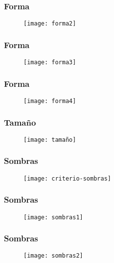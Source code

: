 \documentclass[14pt]{beamer}
\begin{document}
 \begin{frame}
\frametitle{Forma}
 \begin{figure}
    \centering
    \texttt{[image: forma2]}
  \end{figure}
\end{frame}
 \begin{frame}
\frametitle{Forma}
 \begin{figure}
    \centering
    \texttt{[image: forma3]}
  \end{figure}
\end{frame}
 \begin{frame}
\frametitle{Forma}
 \begin{figure}
    \centering
    \texttt{[image: forma4]}
  \end{figure}
\end{frame}
 \begin{frame}
\frametitle{Tamaño}
 \begin{figure}
    \centering
    \texttt{[image: tamaño]}
  \end{figure}
\end{frame}
 \begin{frame}
\frametitle{Sombras}
 \begin{figure}
    \centering
    \texttt{[image: criterio-sombras]}
  \end{figure}
\end{frame}
 \begin{frame}
\frametitle{Sombras}
 \begin{figure}
    \centering
    \texttt{[image: sombras1]}
  \end{figure}
\end{frame}
 \begin{frame}
\frametitle{Sombras}
 \begin{figure}
    \centering
    \texttt{[image: sombras2]}
  \end{figure}
\end{frame}
\end{document}
